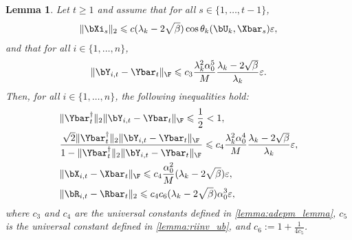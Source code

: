 \documentclass{article}
\theoremstyle{plain}
\newtheorem{lemma}[theorem]{Lemma}
\theoremstyle{definition}
\theoremstyle{remark}
\begin{document}
\begin{lemma}\label{lemma:allbounds_adepm}
  Let $t\geqslant 1$ and assume that for all $s \in \{1, \dots, t-1\}$,
  \begin{align*}
    \Vert\bXi_s\Vert_2 \leqslant c (\lambda_k - 2\sqrt{\beta}) \cos \theta_k(\bU_k, \Xbar_s) \varepsilon,
  \end{align*}
  and that for all $i\in\{1,\dots,n\}$,
  \begin{align*}
    \Vert\bY_{i,t} - \Ybar_t \Vert_\F \leqslant c_3\frac{\lambda_k^2 \alpha_0^5}{M} \frac{\lambda_k-2\sqrt{\beta}}{\lambda_k}\varepsilon.
  \end{align*}
  Then, for all $i\in\{1,\dots,n\}$, the following inequalities hold:
  \begin{align}
    & \Vert\Ybar_t^\dagger\Vert_2\Vert\bY_{i,t} - \Ybar_t\Vert_\F \leqslant \frac{1}{2} < 1, \label{eq:ydag_ydiff_half}\\
    & \frac{\sqrt{2}\Vert\Ybar_t^\dagger\Vert_2\Vert\bY_{i,t} - \Ybar_t\Vert_\F}{1 - \Vert\Ybar_t^\dagger\Vert_2\Vert\bY_{i,t} - \Ybar_t\Vert_\F} \leqslant c_4\frac{\lambda_k^2 \alpha_0^4}{M} \frac{\lambda_k-2\sqrt{\beta}}{\lambda_k}\varepsilon, \label{eq:qr_bound_yfactor} \\
    & \Vert \bX_{i,t} - \Xbar_t \Vert_\F \leqslant c_4 \frac{\alpha_0^2}{M} (\lambda_k-2\sqrt{\beta})\varepsilon, \label{eq:xdiff_bound}\\
    & \Vert \bR_{i,t} - \Rbar_t \Vert_2 \leqslant c_4c_6 (\lambda_k-2\sqrt{\beta})\alpha_0^3 \varepsilon, \label{eq:rdiff_bound}
  \end{align}
  where $c_3$ and $c_4$ are the universal constants defined in \cref{lemma:adepm_lemma}, $c_5$ is the universal constant defined in \cref{lemma:riinv_ub}, and $c_6 := 1 +\frac{1}{4c_5}$.
\end{lemma}
\end{document}
